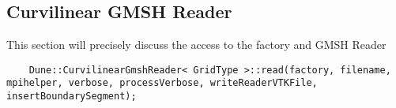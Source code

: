 \subsection{Curvilinear GMSH Reader}
\label{interface-gmsh-reader}

This section will precisely discuss the access to the factory and GMSH Reader

\begin{mybox}
\begin{lstlisting}
    Dune::CurvilinearGmshReader< GridType >::read(factory, filename, mpihelper, verbose, processVerbose, writeReaderVTKFile, insertBoundarySegment); 
\end{lstlisting}
\end{mybox}